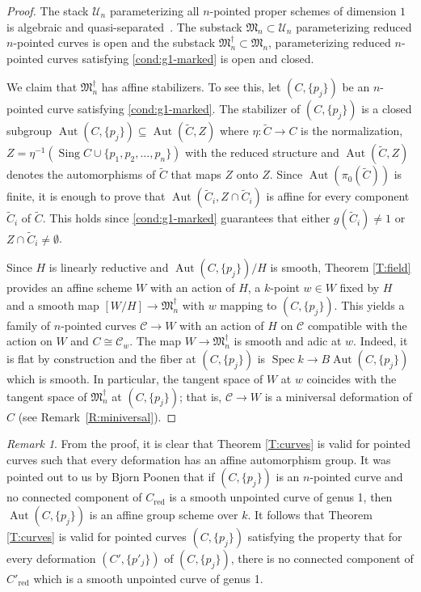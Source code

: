 \documentclass[a4paper]{amsart}
\theoremstyle{plain}
\theoremstyle{definition}
\theoremstyle{remark}
\newtheorem{remark}[theorem]{Remark}
\numberwithin{equation}{section}
\newcommand{\red}{\mathrm{red}}
\newcommand\cC{\mathcal{C}}
\DeclareMathOperator{\Sing}{Sing}
\DeclareMathOperator{\Spec}{Spec}
\renewcommand{\tilde}{\widetilde}
\DeclareMathOperator{\Aut}{Aut}
\newcommand{\itemref}[1]{\eqref{#1}}
\begin{document}
\begin{proof}
The stack $\mathcal{U}_n$ parameterizing all $n$-pointed proper schemes of
dimension $1$ is algebraic and quasi-separated~\cite[App.~B]{smyth_towards-a-classification-modular-compactifications}.
The substack $\mathfrak{M}_n\subset \mathcal{U}_n$ parameterizing reduced
$n$-pointed curves is open and the substack $\mathfrak{M}^\dagger_n\subset
\mathfrak{M}_n$, parameterizing reduced $n$-pointed curves satisfying
\itemref{cond:g1-marked} is open and closed.

We claim that $\mathfrak{M}^\dagger_n$ has affine stabilizers. To see this, let
$(C,\{p_j\})$ be an $n$-pointed curve satisfying \itemref{cond:g1-marked}.
The stabilizer of $(C,\{p_j\})$ is a closed subgroup $\Aut(C,
\{p_j\})\subseteq \Aut(\tilde{C}, Z)$ where $\eta\colon \tilde{C}\to C$ is the normalization, $Z=\eta^{-1}(\Sing C\cup
\{p_1,p_2,\dots,p_n\})$ with the reduced structure and $\Aut(\tilde{C},Z)$ denotes the automorphisms of $\tilde{C}$ that maps $Z$ onto $Z$. Since $\Aut(\pi_0(\tilde{C}))$ is finite, it is
enough to prove that $\Aut(\tilde{C}_i,Z\cap \tilde{C}_i)$ is affine for every component $\tilde{C}_i$ of $\tilde{C}$. This holds
since \itemref{cond:g1-marked} guarantees that either $g(\tilde{C}_i)\neq 1$ or
$Z\cap \tilde{C}_i\neq \emptyset$.

Since $H$ is linearly reductive and $\Aut(C,\{p_j\})/H$ is smooth, Theorem \ref{T:field} provides an affine scheme $W$ with an action of $H$, a $k$-point $w \in W$ fixed by $H$ and a smooth map $[W/H] \to \mathfrak{M}^\dagger_n$ with $w$ mapping to $(C, \{p_j\})$.  This yields a family of $n$-pointed curves $\cC \to W$ with an action of $H$ on $\cC$ compatible with the action on $W$ and $C \cong \cC_w$.  The map $W \to \mathfrak{M}^\dagger_n$ is smooth and adic at $w$. Indeed, it is flat by construction and the fiber at $(C,\{p_j\})$ is $\Spec k\to B\Aut(C,\{p_j\})$ which is smooth. In particular, the tangent space of $W$ at $w$ coincides with the tangent space of $\mathfrak{M}^\dagger_n$ at $(C,\{p_j\})$; that is, $\cC \to W$ is a miniversal deformation of $C$ (see Remark~\ref{R:miniversal}).
\end{proof}


\begin{remark}
From the proof, it is clear that Theorem \ref{T:curves} is valid for pointed curves such that every deformation has an affine automorphism group.  It was pointed out to us by Bjorn Poonen that if $(C, \{p_j\})$ is an $n$-pointed curve  and no connected component of $C_{\red}$ is a smooth unpointed curve of genus 1, then $\Aut(C, \{p_j\})$ is an affine group scheme over $k$.  It follows that Theorem \ref{T:curves} is valid for pointed curves $(C, \{p_j\})$ satisfying the property that for every deformation $(C', \{p'_j\})$ of $(C, \{p_j\})$, there is no connected component of $C'_{\red}$ which is a smooth unpointed curve of genus 1.
\end{remark}
\end{document}
